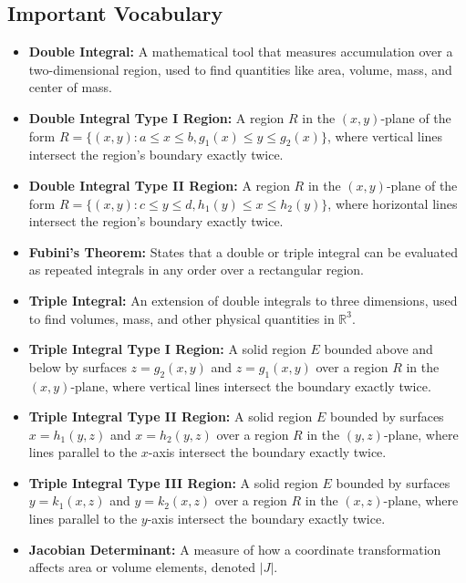 \subsection*{Important Vocabulary}
\begin{itemize}
\item \textbf{Double Integral:} A mathematical tool that measures accumulation over a two-dimensional region, used to find quantities like area, volume, mass, and center of mass.

\item \textbf{Double Integral Type I Region:} A region \(R\) in the \((x,y)\)-plane of the form \(R = \{(x,y) : a \leq x \leq b, g_1(x) \leq y \leq g_2(x)\}\), where vertical lines intersect the region's boundary exactly twice.

\item \textbf{Double Integral Type II Region:} A region \(R\) in the \((x,y)\)-plane of the form \(R = \{(x,y) : c \leq y \leq d, h_1(y) \leq x \leq h_2(y)\}\), where horizontal lines intersect the region's boundary exactly twice.

\item \textbf{Fubini's Theorem:} States that a double or triple integral can be evaluated as repeated integrals in any order over a rectangular region.

\item \textbf{Triple Integral:} An extension of double integrals to three dimensions, used to find volumes, mass, and other physical quantities in \(\mathbb{R}^3\).

\item \textbf{Triple Integral Type I Region:} A solid region \(E\) bounded above and below by surfaces \(z = g_2(x,y)\) and \(z = g_1(x,y)\) over a region \(R\) in the \((x,y)\)-plane, where vertical lines intersect the boundary exactly twice.

\item \textbf{Triple Integral Type II Region:} A solid region \(E\) bounded by surfaces \(x = h_1(y,z)\) and \(x = h_2(y,z)\) over a region \(R\) in the \((y,z)\)-plane, where lines parallel to the \(x\)-axis intersect the boundary exactly twice.

\item \textbf{Triple Integral Type III Region:} A solid region \(E\) bounded by surfaces \(y = k_1(x,z)\) and \(y = k_2(x,z)\) over a region \(R\) in the \((x,z)\)-plane, where lines parallel to the \(y\)-axis intersect the boundary exactly twice.

\item \textbf{Jacobian Determinant:} A measure of how a coordinate transformation affects area or volume elements, denoted \(|J|\).


\end{itemize}
